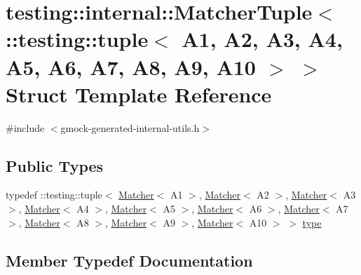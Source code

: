 \hypertarget{structtesting_1_1internal_1_1_matcher_tuple_3_01_1_1testing_1_1tuple_3_01_a1_00_01_a2_00_01_a3_0842d32b3c1d00aa4e42fe38fbc4fa689}{}\section{testing\+::internal\+::Matcher\+Tuple$<$ \+::testing\+::tuple$<$ A1, A2, A3, A4, A5, A6, A7, A8, A9, A10 $>$ $>$ Struct Template Reference}
\label{structtesting_1_1internal_1_1_matcher_tuple_3_01_1_1testing_1_1tuple_3_01_a1_00_01_a2_00_01_a3_0842d32b3c1d00aa4e42fe38fbc4fa689}


{\ttfamily \#include $<$gmock-\/generated-\/internal-\/utils.\+h$>$}

\subsection*{Public Types}
\begin{DoxyCompactItemize}
\item 
typedef \+::testing\+::tuple$<$ \mbox{\hyperlink{classtesting_1_1_matcher}{Matcher}}$<$ A1 $>$, \mbox{\hyperlink{classtesting_1_1_matcher}{Matcher}}$<$ A2 $>$, \mbox{\hyperlink{classtesting_1_1_matcher}{Matcher}}$<$ A3 $>$, \mbox{\hyperlink{classtesting_1_1_matcher}{Matcher}}$<$ A4 $>$, \mbox{\hyperlink{classtesting_1_1_matcher}{Matcher}}$<$ A5 $>$, \mbox{\hyperlink{classtesting_1_1_matcher}{Matcher}}$<$ A6 $>$, \mbox{\hyperlink{classtesting_1_1_matcher}{Matcher}}$<$ A7 $>$, \mbox{\hyperlink{classtesting_1_1_matcher}{Matcher}}$<$ A8 $>$, \mbox{\hyperlink{classtesting_1_1_matcher}{Matcher}}$<$ A9 $>$, \mbox{\hyperlink{classtesting_1_1_matcher}{Matcher}}$<$ A10 $>$ $>$ \mbox{\hyperlink{structtesting_1_1internal_1_1_matcher_tuple_3_01_1_1testing_1_1tuple_3_01_a1_00_01_a2_00_01_a3_0842d32b3c1d00aa4e42fe38fbc4fa689_ad8f6e383d160062fe6ccf40a839fdd31}{type}}
\end{DoxyCompactItemize}


\subsection{Member Typedef Documentation}
\mbox{\label{structtesting_1_1internal_1_1_matcher_tuple_3_01_1_1testing_1_1tuple_3_01_a1_00_01_a2_00_01_a3_0842d32b3c1d00aa4e42fe38fbc4fa689_ad8f6e383d160062fe6ccf40a839fdd31}} 
